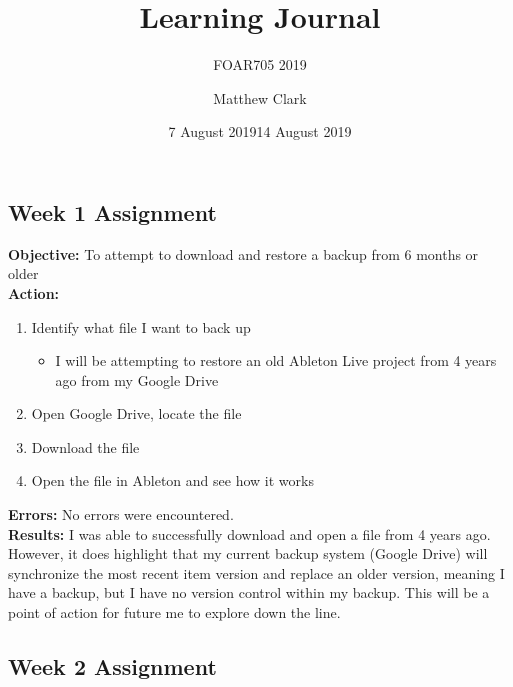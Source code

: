 \documentclass{article}
\title{Learning Journal}
\subtitle{FOAR705 2019}
\author{Matthew Clark}
\date{\vspace{-5ex}} %
\begin{document}
\maketitle
\newpage
\begin{center}
\section*{Week 1 Assignment}
\date{7 August 2019}
\end{center}

\textbf{Objective:} To attempt to download and restore a backup from 6 months or older\\
\textbf{Action:}
\begin{enumerate}
    \item Identify what file I want to back up
    \begin{itemize}
        \item I will be attempting to restore an old Ableton Live project from 4 years ago from my Google Drive
    \end{itemize}
    \item Open Google Drive, locate the file
    \item Download the file
    \item Open the file in Ableton and see how it works
\end{enumerate}
\textbf{Errors:} No errors were encountered. \\
\textbf{Results:} I was able to successfully download and open a file from 4 years ago. However, it does highlight that my current backup system (Google Drive) will synchronize the most recent item version and replace an older version, meaning I have a backup, but I have no version control within my backup. This will be a point of action for future me to explore down the line.
\newpage
\begin{center}
\section*{Week 2 Assignment}
\date{14 August 2019}
\end{center}
\end{document}
